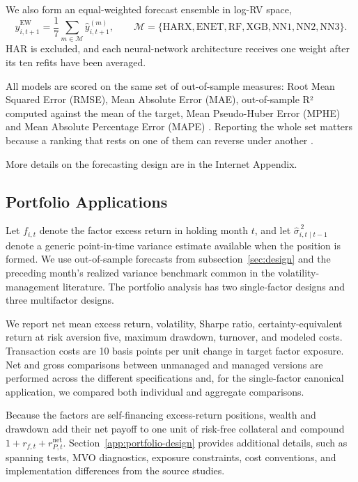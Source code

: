 \documentclass[preprint,12pt,authoryear]{elsarticle}
\begin{document}
We also form an equal-weighted forecast ensemble in log-RV space,
\begin{equation}
\widehat{y}^{\mathrm{EW}}_{i,t+1}=\frac{1}{7}\sum_{m\in\mathcal{M}}\widehat{y}^{(m)}_{i,t+1},
\qquad
\mathcal{M}=\{\mathrm{HARX,ENET,RF,XGB,NN1,NN2,NN3}\}.
\label{eq:forecast-ensemble}
\end{equation}
HAR is excluded, and each neural-network architecture receives one weight after its ten refits have been averaged.

All models are scored on the same set of out-of-sample measures: Root Mean Squared Error (RMSE), Mean Absolute Error (MAE), out-of-sample R² computed against the mean of the target, Mean Pseudo-Huber Error (MPHE) and Mean Absolute Percentage Error (MAPE) . Reporting the whole set matters because a ranking that rests on one of them can reverse under another \citep{patton2011}.

More details on the forecasting design are in the Internet Appendix.


\subsection{Portfolio Applications}
\label{sec:portfolios}

Let $f_{i,t}$ denote the factor excess return in holding month $t$, and let $\widehat{\sigma}^{\,2}_{i,t\mid t-1}$ denote a generic point-in-time variance estimate available when the position is formed. We use out-of-sample forecasts from subsection~\ref{sec:design} and the preceding month's realized variance benchmark common in the volatility-management literature. The portfolio analysis has two single-factor designs and three multifactor designs. 

We report net mean excess return, volatility, Sharpe ratio, certainty-equivalent return at risk aversion five, maximum drawdown, turnover, and modeled costs. Transaction costs are 10 basis points per unit change in target factor exposure. Net and gross comparisons between unmanaged and managed versions are performed across the different specifications and, for the single-factor canonical application, we compared both individual and aggregate comparisons.

 Because the factors are self-financing excess-return positions, wealth and drawdown add their net payoff to one unit of risk-free collateral and compound $1+r_{f,t}+r^{\mathrm{net}}_{P,t}$. Section~\ref{app:portfolio-design} provides additional details, such as spanning tests, MVO diagnostics, exposure constraints, cost conventions, and implementation differences from the source studies.
\end{document}
